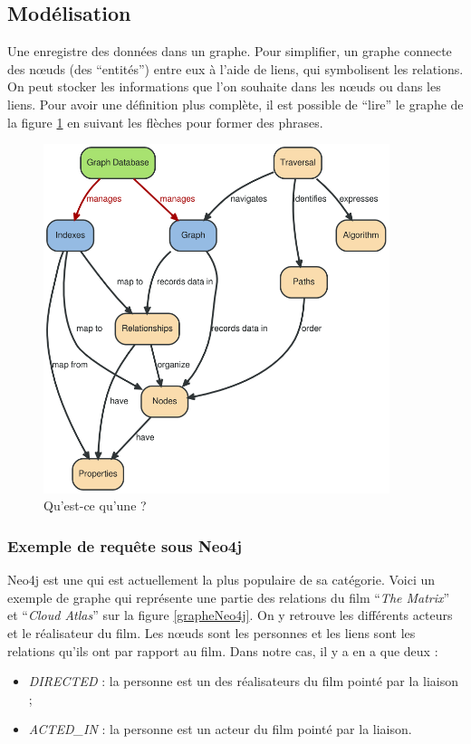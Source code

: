 \subsection{Modélisation}
	Une \bddGraphe{} enregistre des données dans un graphe. Pour simplifier, un graphe connecte des nœuds (des \enquote{entités}) entre eux à l'aide de liens, qui symbolisent les relations. On peut stocker les informations que l'on souhaite dans les nœuds ou dans les liens. Pour avoir une définition plus complète, il est possible de \enquote{lire} le graphe de la figure \ref{bddGrapheSVG} en suivant les flèches pour former des phrases.

	\begin{figure}[H]
		\centering
		\includegraphics[width=0.9\textwidth]{images/bddGraphe.png}
		\caption{Qu'est-ce qu'une \bddGraphe{} ? \cite{bddGrapheSchema}}
		\label{bddGrapheSVG}
	\end{figure}

	\subsubsection{Exemple de requête sous Neo4j}
		Neo4j est une \bddGraphe{} qui est actuellement la plus populaire de sa catégorie. Voici un exemple de graphe qui représente une partie des relations du film \enquote{\textit{The Matrix}} et \enquote{\textit{Cloud Atlas}} sur la figure \ref{grapheNeo4j}. On y retrouve les différents acteurs et le réalisateur du film. Les nœuds sont les personnes et les liens sont les relations qu'ils ont par rapport au film. Dans notre cas, il y a en a que deux :
		\vspace{5px}
		\begin{itemize}
			\item \textit{DIRECTED} : la personne est un des réalisateurs du film pointé par la liaison ; 
			\item \textit{ACTED\_IN} : la personne est un acteur du film pointé par la liaison. 
		\end{itemize}


